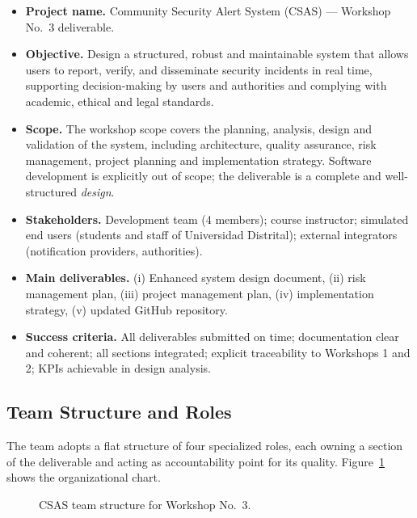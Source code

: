 \documentclass[conference,a4paper,10pt]{IEEEtran}
\begin{document}
\begin{itemize}[leftmargin=*]
  \item \textbf{Project name.} Community Security Alert System (CSAS)
  --- Workshop No.\ 3 deliverable.
  \item \textbf{Objective.} Design a structured, robust and maintainable
  system that allows users to report, verify, and disseminate security
  incidents in real time, supporting decision-making by users and
  authorities and complying with academic, ethical and legal standards.
  \item \textbf{Scope.} The workshop scope covers the planning, analysis,
  design and validation of the system, including architecture, quality
  assurance, risk management, project planning and implementation
  strategy. Software development is explicitly out of scope; the
  deliverable is a complete and well-structured \emph{design}.
  \item \textbf{Stakeholders.} Development team (4 members);
  course instructor; simulated end users (students and staff of
  Universidad Distrital); external integrators (notification providers,
  authorities).
  \item \textbf{Main deliverables.} (i) Enhanced system design document,
  (ii) risk management plan, (iii) project management plan,
  (iv) implementation strategy, (v) updated GitHub repository.
  \item \textbf{Success criteria.} All deliverables submitted on time;
  documentation clear and coherent; all sections integrated; explicit
  traceability to Workshops 1 and 2; KPIs achievable in design analysis.
\end{itemize}

\subsection{Team Structure and Roles}

The team adopts a flat structure of four specialized roles, each owning a
section of the deliverable and acting as accountability point for its
quality. Figure~\ref{fig:org} shows the organizational chart.

\begin{figure}[H]
\centering
{}
\caption{CSAS team structure for Workshop No.\ 3.}
\label{fig:org}
\end{figure}
\end{document}
